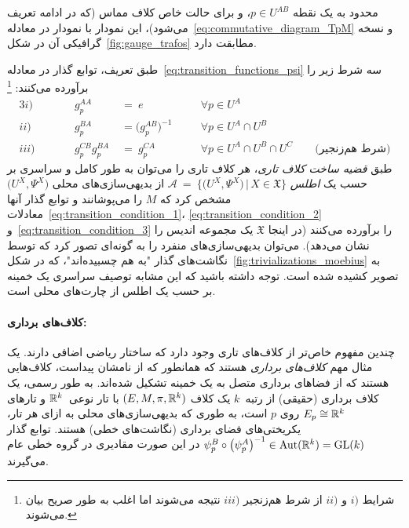 محدود به یک نقطه $p\in U^{AB}$، و برای حالت خاص کلاف مماس (که در ادامه تعریف می‌شود)، این نمودار با نمودار در معادله~\eqref{eq:commutative_diagram_TpM} و نسخه گرافیکی آن در شکل~\ref{fig:gauge_trafos} مطابقت دارد.


طبق تعریف، توابع گذار در معادله~\eqref{eq:transition_functions_psi} سه شرط زیر را برآورده می‌کنند:%
\footnote{%
	شرایط $i)$ و $ii)$ از شرط هم‌زنجیر $iii)$ نتیجه می‌شوند اما اغلب به طور صریح بیان می‌شوند.
}
\begin{alignat}{3}
	   i) \qquad&& g_p^{AA}    \;&=\ e                      \quad&&\forall p\in U^A \label{eq:transition_condition_1}\\
	  ii) \qquad&& g_p^{BA}    \;&=\big(g_p^{AB}\big)^{-1} \quad&&\forall p\in U^A\cap U^B \label{eq:transition_condition_2}\\
	 iii) \qquad&& g_p^{CB} g_p^{BA}\;&=\ g_p^{CA}            \quad&&\forall p\in U^A\cap U^B\cap U^C \qquad \text{(شرط هم‌زنجیر)} \label{eq:transition_condition_3}
\end{alignat}
طبق \emph{قضیه ساخت کلاف تاری}، هر کلاف تاری را می‌توان به طور کامل و سراسری بر حسب یک \emph{اطلس}
$\mathscr{A}\ =\ \big\{\big( U^X, \Psi^X \big) \,\big|\, X\in\mathfrak{X} \big\}$
از بدیهی‌سازی‌های محلی $\big(U^X,\Psi^X\big)$ مشخص کرد که $M$ را می‌پوشانند و توابع گذار آنها معادلات~\eqref{eq:transition_condition_1}، \eqref{eq:transition_condition_2} و~\eqref{eq:transition_condition_3} را برآورده می‌کنند (در اینجا $\mathfrak{X}$ یک مجموعه اندیس را نشان می‌دهد).
می‌توان بدیهی‌سازی‌های منفرد را به گونه‌ای تصور کرد که توسط نگاشت‌های گذار "به هم چسبیده‌اند"، که در شکل~\ref{fig:trivializations_moebius} به تصویر کشیده شده است.
توجه داشته باشید که این مشابه توصیف سراسری یک خمینه بر حسب یک اطلس از چارت‌های محلی است.


\paragraph{کلاف‌های برداری:}
چندین مفهوم خاص‌تر از کلاف‌های تاری وجود دارد که ساختار ریاضی اضافی دارند.
یک مثال مهم \emph{کلاف‌های برداری} هستند که همانطور که از نامشان پیداست، کلاف‌هایی هستند که از فضاهای برداری متصل به یک خمینه تشکیل شده‌اند.
به طور رسمی، یک کلاف برداری (حقیقی) از رتبه~$k$ یک کلاف $(E,M,\pi,\mathbb{R}^k)$ با تار نوعی~$\mathbb{R}^k$ و تارهای $E_p \cong \mathbb{R}^k$ روی $p$ است، به طوری که بدیهی‌سازی‌های محلی به ازای هر تار، یکریختی‌های فضای برداری (نگاشت‌های خطی) هستند.
توابع گذار $\psi^B_p \circ \big(\psi^A_p\big)^{-1} \in \operatorname{Aut}(\mathbb{R}^k) = \operatorname{GL}(k)$ در این صورت مقادیری در گروه خطی عام می‌گیرند.

